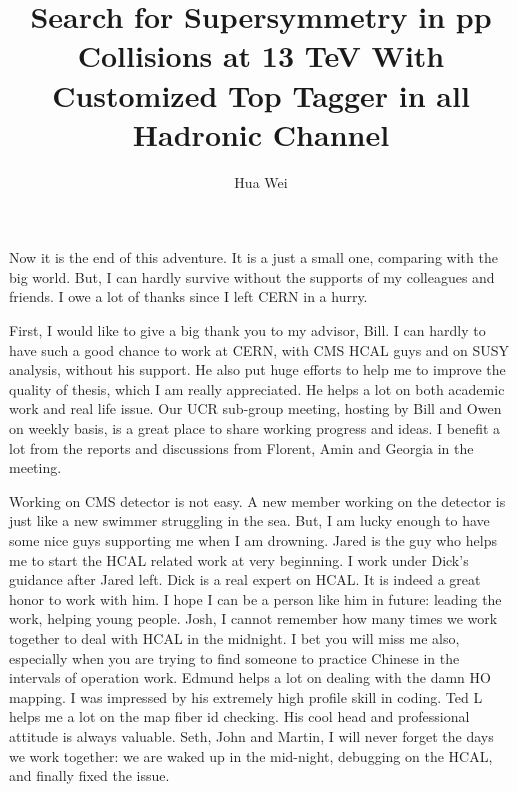 \documentclass[oneside,final,letterpaper]{ucr}
\begin{document}

\title{Search for Supersymmetry in pp Collisions at 13 TeV With Customized Top Tagger in all Hadronic Channel}
\author{Hua Wei}

\maketitle
\copyrightpage{}
\approvalpage{}

\begin{frontmatter}

\begin{acknowledgements}
Now it is the end of this adventure. It is a just a small one, comparing with the big world. But, I can hardly survive without the supports of my colleagues and friends. I owe a lot of thanks since I left CERN in a hurry. 

First, I would like to give a big thank you to my advisor, Bill. I can hardly to have such a good chance to work at CERN, with CMS HCAL guys and on SUSY analysis, without his support. He also put huge efforts to help me to improve the quality of thesis, which I am really appreciated. He helps a lot on both academic work and real life issue. Our UCR sub-group meeting, hosting by Bill and Owen on weekly basis, is a great place to share working progress and ideas. I benefit a lot from the reports and discussions from Florent, Amin and Georgia in the meeting. 

Working on CMS detector is not easy. A new member working on the detector is just like a new swimmer struggling in the sea. But, I am lucky enough to have some nice guys supporting me when I am drowning. Jared is the guy who helps me to start the HCAL related work at very beginning. I work under Dick's guidance after Jared left. Dick is a real expert on HCAL. It is indeed a great honor to work with him. I hope I can be a person like him in future: leading the work, helping young people. Josh, I cannot remember how many times we work together to deal with HCAL in the midnight. I bet you will miss me also, especially when you are trying to find someone to practice Chinese in the intervals of operation work. Edmund helps a lot on dealing with the damn HO mapping. I was impressed by his extremely high profile skill in coding. Ted L helps me a lot on the map fiber id checking. His cool head and professional attitude is always valuable. Seth, John and Martin, I will never forget the days we work together: we are waked up in the mid-night, debugging on the HCAL, and finally fixed the issue. 


\end{acknowledgements}
\end{frontmatter}
\end{document}
